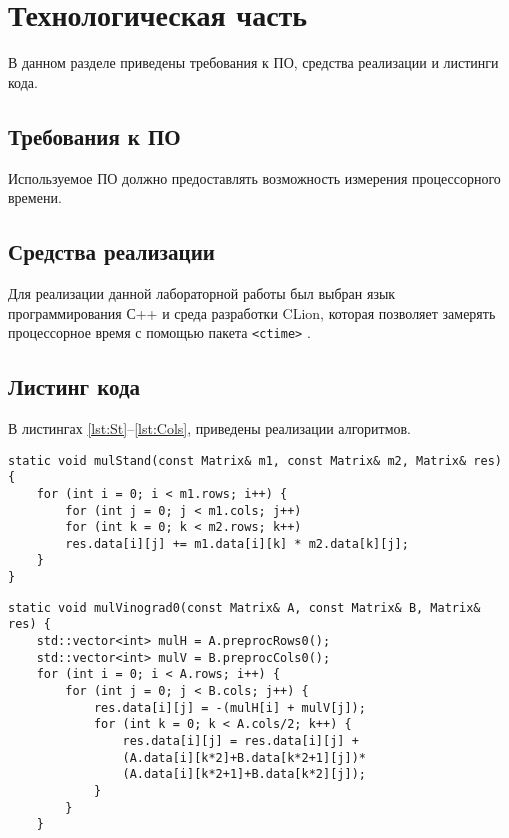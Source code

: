 \chapter{Технологическая часть}

В данном разделе приведены требования к ПО, средства реализации и листинги кода.

\section{Требования к ПО}

Используемое ПО должно предоставлять возможность измерения процессорного времени.

\section{Средства реализации}

Для реализации данной лабораторной работы был выбран язык программирования С++ \cite{c} и среда разработки CLion, которая позволяет замерять процессорное время с помощью пакета \texttt{<ctime>} \cite{ctime}.

\section{Листинг кода}

В листингах \ref{lst:St}--\ref{lst:Cols},  приведены реализации алгоритмов.

\clearpage
\begin{lstlisting}[label=lst:St,caption=Функция умножения матриц по стандартному алгоритму]
static void mulStand(const Matrix& m1, const Matrix& m2, Matrix& res) {
	for (int i = 0; i < m1.rows; i++) {
		for (int j = 0; j < m1.cols; j++)
		for (int k = 0; k < m2.rows; k++)
		res.data[i][j] += m1.data[i][k] * m2.data[k][j];
	}
}	
\end{lstlisting}

\begin{lstlisting}[label=lst:VinSlow,caption=Функция умножения матриц по алгоритму Винограда (начало)]
static void mulVinograd0(const Matrix& A, const Matrix& B, Matrix& res) {
	std::vector<int> mulH = A.preprocRows0();
	std::vector<int> mulV = B.preprocCols0();
	for (int i = 0; i < A.rows; i++) {
		for (int j = 0; j < B.cols; j++) {
			res.data[i][j] = -(mulH[i] + mulV[j]);
			for (int k = 0; k < A.cols/2; k++) {
				res.data[i][j] = res.data[i][j] +
				(A.data[i][k*2]+B.data[k*2+1][j])*
				(A.data[i][k*2+1]+B.data[k*2][j]);
			}
		}
	}
\end{lstlisting}	

